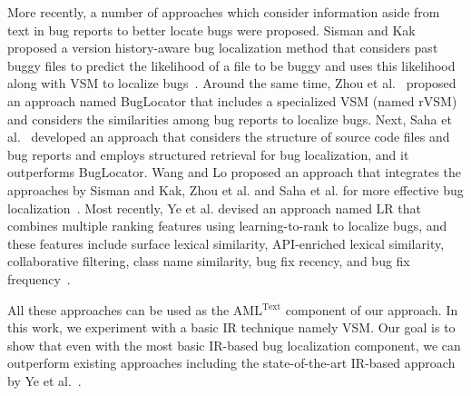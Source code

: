 More recently, a number of approaches which consider information aside from text in bug reports to better locate bugs were proposed. Sisman and Kak proposed a version history-aware bug localization method that considers past buggy files to predict the likelihood of a file to be buggy and uses this likelihood along with VSM to localize bugs~\cite{Sisman:2012:IVH:2664446.2664454}. Around the same time, Zhou et al.~\cite{Zhou:2012:BFM:2337223.2337226} proposed an approach named BugLocator that includes a specialized VSM (named rVSM) and considers the similarities among bug reports to localize bugs. Next, Saha et al.~\cite{SahaLKP13} developed an approach that considers the structure of source code files and bug reports and employs structured retrieval for bug localization, and it outperforms BugLocator. Wang and Lo proposed an approach that integrates the approaches by Sisman and Kak, Zhou et al. and Saha et al. for more effective bug localization~\cite{WL14}. Most recently, Ye et al. devised an approach named LR that combines multiple ranking features using learning-to-rank to localize bugs, and these features include surface lexical similarity, API-enriched lexical similarity, collaborative filtering, class name similarity, bug fix recency, and bug fix frequency~\cite{YeBL14}.




All these approaches can be used as the AML$^\text{Text}$ component of our approach. In this work, we experiment with a basic IR technique namely VSM. Our goal is to show that even with the most basic IR-based bug localization component, we can outperform existing approaches including the state-of-the-art IR-based approach by Ye et al.~\cite{YeBL14}.

